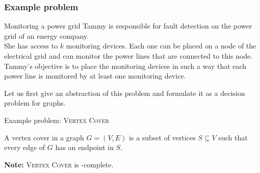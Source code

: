 \begin{frame}
	\frametitle{Example problem}
	
	\begin{block}{Monitoring a power grid}
	Tammy is responsible for fault detection on the power grid of an energy company.\\\smallskip
	She has access to $k$ monitoring devices. Each one can be placed on a node of the electrical grid and can monitor the power lines that are connected to this node.\\\smallskip
	Tammy's objective is to place the monitoring devices in such a way that each power line is monitored by at least one monitoring device.
	\end{block}
	Let us first give an abstraction of this problem and formulate it as a decision problem for graphs.
\end{frame}


\begin{frame}{Example problem: \textsc{Vertex Cover}}

 \noindent
 A \alert{vertex cover} in a graph $G=(V,E)$ is a subset of vertices $S\subseteq V$ such that every edge of $G$ has an endpoint in $S$.


 \noindent
 \textbf{Note:}
  \textsc{Vertex Cover} is \NP-complete.
 
 \begin{center}
 \end{center}
 
\end{frame}



